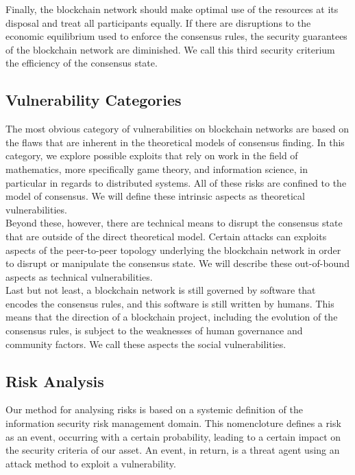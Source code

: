 \documentclass[12pt,a4paper]{article}
\begin{document}
Finally, the blockchain network should make optimal use of the resources at its disposal and treat all participants equally. If there are disruptions to the economic equilibrium used to enforce the consensus rules, the security guarantees of the blockchain network are diminished. We call this third security criterium the efficiency of the consensus state.\\

\subsection{Vulnerability Categories}

The most obvious category of vulnerabilities on blockchain networks are based on the flaws that are inherent in the theoretical models of consensus finding. In this category, we explore possible exploits that rely on work in the field of mathematics, more specifically game theory, and information science, in particular in regards to distributed systems. All of these risks are confined to the model of consensus. We will define these intrinsic aspects as theoretical vulnerabilities.\\

Beyond these, however, there are technical means to disrupt the consensus state that are outside of the direct theoretical model. Certain attacks can exploits aspects of the peer-to-peer topology underlying the blockchain network in order to disrupt or manipulate the consensus state. We will describe these out-of-bound aspects as technical vulnerabilities.\\

Last but not least, a blockchain network is still governed by software that encodes the consensus rules, and this software is still written by humans. This means that the direction of a blockchain project, including the evolution of the consensus rules, is subject to the weaknesses of human governance and community factors. We call these aspects the social vulnerabilities.\\

\subsection{Risk Analysis}

Our method for analysing risks is based on a systemic definition of the information security risk management domain. This nomencloture defines a risk as an event, occurring with a certain probability, leading to a certain impact on the security criteria of our asset. An event, in return, is a threat agent using an attack method to exploit a vulnerability.\\
\end{document}

